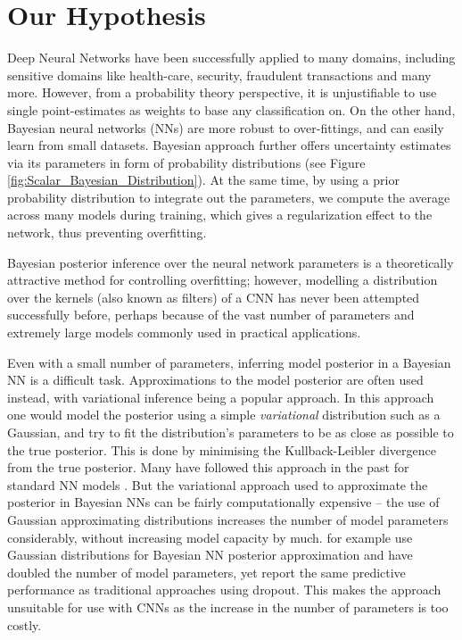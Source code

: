 \section{Our Hypothesis}

Deep Neural Networks have been successfully applied to many domains, including sensitive domains like health-care, security, fraudulent transactions and many more. However, from a probability theory perspective, it is unjustifiable to use single point-estimates as weights to base any classification on.
On the other hand, Bayesian neural networks (NNs) are more robust to over-fittings, and can easily learn from small datasets. Bayesian approach further offers uncertainty estimates via its parameters in form of probability distributions (see Figure \ref{fig:Scalar_Bayesian_Distribution}). At the same time, by using a prior probability distribution to integrate out the parameters, we compute the average across many models during training, which gives a regularization effect to the network, thus preventing overfitting.


Bayesian posterior inference over the neural network parameters is a theoretically attractive method for controlling overfitting; however, modelling a distribution over the kernels (also known as filters) of a CNN has never been attempted successfully before, perhaps because of the vast number of parameters and extremely large models commonly used in practical applications.

Even with a small number of parameters, inferring model posterior in a Bayesian NN is a difficult task. Approximations to the model posterior are often used instead, with variational inference being a popular approach. In this approach one would model the posterior using a simple \textit{variational} distribution such as a Gaussian, and try to fit the distribution's parameters to be as close as possible to the true posterior. This is done by minimising the Kullback-Leibler divergence from the true posterior. Many have followed this approach in the past for standard NN models \citep{hinton1993keeping,barber1998ensemble,graves2011practical,blundell2015weight}.
But the variational approach used to approximate the posterior in Bayesian NNs can be fairly computationally expensive -- the use of Gaussian approximating distributions increases the number of model parameters considerably, without increasing model capacity by much. \citet{blundell2015weight} for example use Gaussian distributions for Bayesian NN posterior approximation and have doubled the number of model parameters, yet report the same predictive performance as traditional approaches using dropout. This makes the approach unsuitable for use with CNNs as the increase in the number of parameters is too costly.

